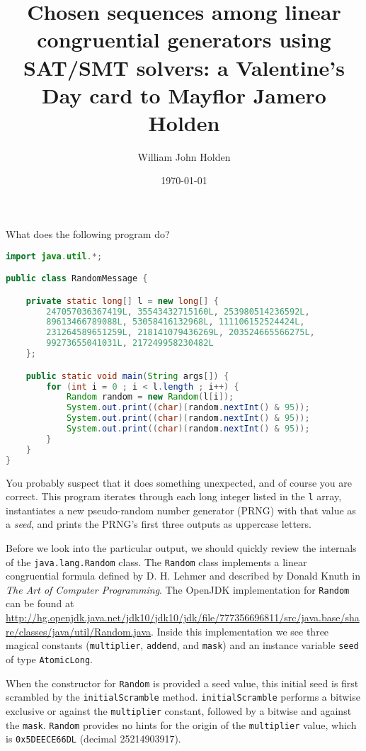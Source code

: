 \documentclass[12pt]{article}
\title{Chosen sequences among linear congruential generators using SAT/SMT solvers: a Valentine's Day card to Mayflor Jamero Holden}
\author{William John Holden}
\date{\today}
\begin{document}
\maketitle

What does the following program do?

\begin{lstlisting}[language=Java]
import java.util.*;

public class RandomMessage {

    private static long[] l = new long[] {
        247057036367419L, 35543432715160L, 253980514236592L,
        89613466789088L, 53058416132968L, 111106152524424L,
        231264589651259L, 218141079436269L, 203524665566275L,
        99273655041031L, 217249958230482L
    };

    public static void main(String args[]) {
        for (int i = 0 ; i < l.length ; i++) {
            Random random = new Random(l[i]);
            System.out.print((char)(random.nextInt() & 95));
            System.out.print((char)(random.nextInt() & 95));
            System.out.print((char)(random.nextInt() & 95));
        }
    }
}
\end{lstlisting}

You probably suspect that it does something unexpected, and of course you are correct.
This program iterates through each long integer listed in the \texttt{l} array, instantiates a new pseudo-random number generator (PRNG) with that value as a \textit{seed}, and prints the PRNG's first three outputs as uppercase letters.

Before we look into the particular output, we should quickly review the internals of the \texttt{java.lang.Random} class.
The \texttt{Random} class implements a linear congruential formula defined by D. H. Lehmer and described by Donald Knuth in \textit{The Art of Computer Programming}.
The OpenJDK implementation for \texttt{Random} can be found at \url{http://hg.openjdk.java.net/jdk10/jdk10/jdk/file/777356696811/src/java.base/share/classes/java/util/Random.java}.
Inside this implementation we see three magical constants (\texttt{multiplier}, \texttt{addend}, and \texttt{mask}) and an instance variable \texttt{seed} of type \texttt{AtomicLong}.

When the constructor for \texttt{Random} is provided a seed value, this initial seed is first scrambled by the \texttt{initialScramble} method.
\texttt{initialScramble} performs a bitwise exclusive or against the \texttt{multiplier} constant, followed by a bitwise and against the \texttt{mask}.
\texttt{Random} provides no hints for the origin of the \texttt{multiplier} value, which is \texttt{0x5DEECE66DL} (decimal 25214903917).
\end{document}
